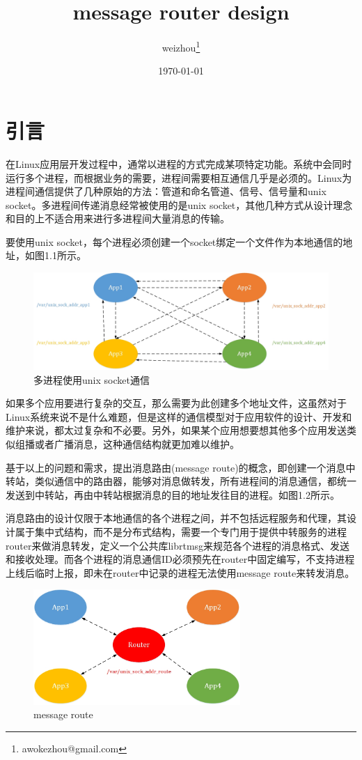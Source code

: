 \documentclass[a4paper,11pt,oneside]{ctexbook}
\title{message router design}
\author{weizhou\thanks{awokezhou@gmail.com}}
\date{\today}
\begin{document}
\maketitle
\tableofcontents

\chapter{引言}
在Linux应用层开发过程中，通常以进程的方式完成某项特定功能。系统中会同时运行多个进程，而根据业务的需要，进程间需要相互通信几乎是必须的。Linux为进程间通信提供了几种原始的方法：管道和命名管道、信号、信号量和unix socket。多进程间传递消息经常被使用的是unix socket，其他几种方式从设计理念和目的上不适合用来进行多进程间大量消息的传输。

要使用unix socket，每个进程必须创建一个socket绑定一个文件作为本地通信的地址，如图1.1所示。

\begin{figure}[ht]
    \centering
    \includegraphics[width=1\textwidth]{image/message-router-01.jpg}
    \caption{多进程使用unix socket通信}
\end{figure}

如果多个应用要进行复杂的交互，那么需要为此创建多个地址文件，这虽然对于Linux系统来说不是什么难题，但是这样的通信模型对于应用软件的设计、开发和维护来说，都太过复杂和不必要。另外，如果某个应用想要想其他多个应用发送类似组播或者广播消息，这种通信结构就更加难以维护。

基于以上的问题和需求，提出消息路由(message route)的概念，即创建一个消息中转站，类似通信中的路由器，能够对消息做转发，所有进程间的消息通信，都统一发送到中转站，再由中转站根据消息的目的地址发往目的进程。如图1.2所示。

消息路由的设计仅限于本地通信的各个进程之间，并不包括远程服务和代理，其设计属于集中式结构，而不是分布式结构，需要一个专门用于提供中转服务的进程router来做消息转发，定义一个公共库librtmsg来规范各个进程的消息格式、发送和接收处理。而各个进程的消息通信ID必须预先在router中固定编写，不支持进程上线后临时上报，即未在router中记录的进程无法使用message route来转发消息。

\newpage
\begin{figure}[ht]
    \centering
    \includegraphics[width=0.7\textwidth]{image/message-router-02.jpg}
    \caption{message route}
\end{figure}
\end{document}
